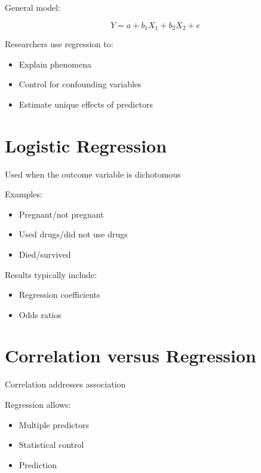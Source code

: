 \documentclass[
  letterpaper,
  DIV=11,
  numbers=noendperiod]{scrreprt}
\providecommand{\tightlist}{%
  \setlength{\itemsep}{0pt}\setlength{\parskip}{0pt}}
\begin{document}
General model:

\[Y = a + b_1X_1 + b_2X_2 + e\]

Researchers use regression to:

\begin{itemize}
\tightlist
\item
  Explain phenomena
\item
  Control for confounding variables
\item
  Estimate unique effects of predictors
\end{itemize}


\chapter{Logistic Regression}\label{logistic-regression}

Used when the outcome variable is dichotomous

Examples:

\begin{itemize}
\tightlist
\item
  Pregnant/not pregnant
\item
  Used drugs/did not use drugs
\item
  Died/survived
\end{itemize}

Results typically include:

\begin{itemize}
\tightlist
\item
  Regression coefficients
\item
  Odds ratios
\end{itemize}


\chapter{Correlation versus
Regression}\label{correlation-versus-regression}

Correlation addresses association

Regression allows:

\begin{itemize}
\tightlist
\item
  Multiple predictors
\item
  Statistical control
\item
  Prediction
\end{itemize}
\end{document}
